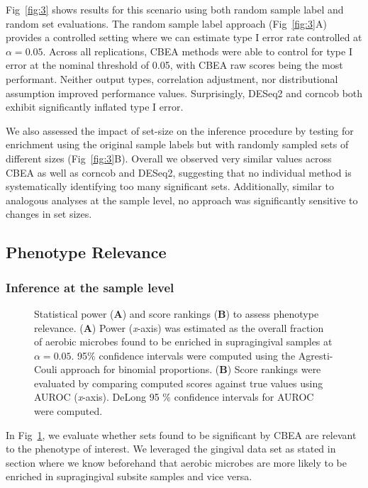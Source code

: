 Fig~\ref{fig:3} shows results for this scenario using both random sample label and random set evaluations. The random sample label approach (Fig~\ref{fig:3}A) provides a controlled setting where we can estimate type I error rate controlled at $\alpha = 0.05$. Across all replications, CBEA methods were able to control for type I error at the nominal threshold of 0.05, with CBEA raw scores being the most performant. Neither output types, correlation adjustment, nor distributional assumption improved performance values. Surprisingly, DESeq2 and corncob both exhibit significantly inflated type I error. 

We also assessed the impact of set-size on the inference procedure by testing for enrichment using the original sample labels but with randomly sampled sets of different sizes (Fig~\ref{fig:3}B). Overall we observed very similar values across CBEA as well as corncob and DESeq2, suggesting that no individual method is systematically identifying too many significant sets. Additionally, similar to analogous analyses at the sample level, no approach was significantly sensitive to changes in set sizes.  

\subsection{Phenotype Relevance} 
\subsubsection{Inference at the sample level}
\begin{figure}[!h]
    \centering
    \caption{Statistical power (\textbf{A}) and score rankings (\textbf{B}) to assess phenotype relevance. (\textbf{A}) Power (\emph{x}-axis) was estimated as the overall fraction of aerobic microbes found to be enriched in supragingival samples at $\alpha = 0.05$. 95\% confidence intervals were computed using the Agresti-Couli approach for binomial proportions. (\textbf{B}) Score rankings were evaluated by comparing computed scores against true values using AUROC (\emph{x}-axis). DeLong 95 \% confidence intervals for AUROC were computed.} 
    \label{fig:4}
\end{figure}

In Fig~\ref{fig:4}, we evaluate whether sets found to be significant by CBEA are relevant to the phenotype of interest. We leveraged the gingival data set as stated in  section where we know beforehand that aerobic microbes are more likely to be enriched in supragingival subsite samples and vice versa. 

